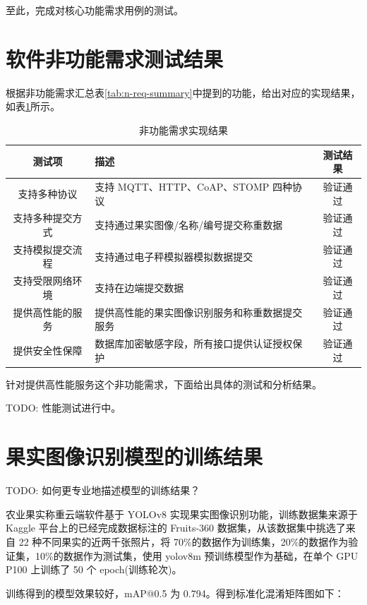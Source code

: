 至此，完成对核心功能需求用例的测试。

\section{软件非功能需求测试结果}

根据非功能需求汇总表\ref{tab:n-req-summary}中提到的功能，给出对应的实现结果，如表\ref{tab:test-n-req-summary}所示。

\begin{longtable}[ht]{|c|p{8cm}|c|}
\caption{非功能需求实现结果}
\label{tab:test-n-req-summary}
\\
\hline
测试项 & 描述 & 测试结果 \\\hline
支持多种协议 & 支持 MQTT、HTTP、CoAP、STOMP 四种协议 & 验证通过 \\\hline
支持多种提交方式 & 支持通过果实图像/名称/编号提交称重数据 & 验证通过 \\\hline
支持模拟提交流程 & 支持通过电子秤模拟器模拟数据提交 & 验证通过 \\\hline
支持受限网络环境 & 支持在边端提交数据 & 验证通过 \\\hline
提供高性能的服务 & 提供高性能的果实图像识别服务和称重数据提交服务 & 验证通过 \\\hline
提供安全性保障 & 数据库加密敏感字段，所有接口提供认证授权保护 & 验证通过 \\\hline
\end{longtable}

针对提供高性能服务这个非功能需求，下面给出具体的测试和分析结果。

TODO: 性能测试进行中。

\section{果实图像识别模型的训练结果}\label{sec:test-model}

TODO: 如何更专业地描述模型的训练结果？

农业果实称重云端软件基于 YOLOv8 实现果实图像识别功能，训练数据集来源于 Kaggle 平台上的已经完成数据标注的 Fruits-360 数据集，从该数据集中挑选了来自 22 种不同果实的近两千张照片，将 70\%的数据作为训练集，20\%的数据作为验证集，10\%的数据作为测试集，使用 yolov8m 预训练模型作为基础，在单个 GPU P100 上训练了 50 个 epoch(训练轮次)。

训练得到的模型效果较好，mAP@0.5 为 0.794。得到标准化混淆矩阵图如下：

